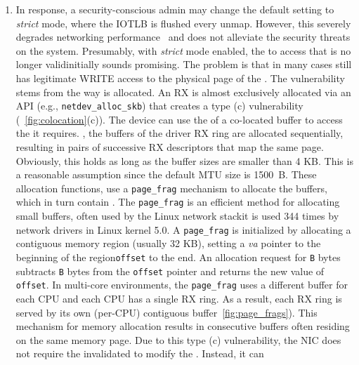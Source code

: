 \begin{enumerate}[label=(\roman*),wide, labelwidth=!, labelindent=0pt]
\item In response, a security-conscious admin may change the default setting to \emph{strict} mode, where the IOTLB is flushed \DIFdelbegin {}\DIFdelend \DIFaddbegin {}\DIFaddend every unmap. However, this \DIFdelbegin {}\DIFdelend severely degrades networking performance~\cite{MMT16,MSMT18} \DIFdelbegin \DIFdel{, }\DIFdelend and does not alleviate the security threats on the system. Presumably, with \emph{strict} mode enabled, the \iova{} \DIFdelbegin {}\DIFdelend \DIFaddbegin {}\DIFaddend to access that \shinfo{} is no longer valid\DIFdelbegin {}\DIFdelend \DIFaddbegin {}\DIFaddend initially sounds promising. The problem is that \DIFdelbegin {}\DIFdelend in many cases \DIFdelbegin \DIFdel{, }\DIFdelend \DIFaddbegin {}\DIFaddend still has legitimate WRITE access to the physical page of the \shinfo. The vulnerability stems from the way \data{} is allocated. An RX \skb{} is almost exclusively allocated via an API (e.g., \texttt{netdev\_alloc\_skb}) that creates a type (c) \subpage{} vulnerability (\DIFdelbegin {}\DIFdelend \DIFaddbegin {}\DIFaddend ~\ref{fig:colocation}(c)). The device can use the \iova{} of a co-located buffer to access the \shinfo{} it requires. \DIFdelbegin {}\DIFdelend \DIFaddbegin {}\DIFaddend , the buffers of the driver RX ring are allocated sequentially, resulting in pairs of successive RX descriptors that map the same page. Obviously, this holds as long as the buffer sizes are smaller than 4 KB. This is a reasonable assumption since the default MTU size is 1500~B. These allocation functions, use a \texttt{page\_frag} mechanism to allocate the \data{} buffers, which in turn contain \shinfo. The \texttt{page\_frag} is an efficient method for allocating small buffers, \DIFaddbegin {}\DIFaddend often used by the Linux network stack\DIFdelbegin \DIFdel{(}\DIFdelend \DIFaddbegin {}\DIFaddend it is used 344 times by network drivers in Linux kernel 5.0\DIFdelbegin \DIFdel{)}\DIFdelend . A \texttt{page\_frag} is initialized by allocating a contiguous memory region (usually 32 KB), setting a \textit{va} pointer to the beginning of the region\DIFdelbegin {}\DIFdelend \DIFaddbegin {}\DIFaddend \texttt{offset} to the end. An allocation request for \texttt{B} bytes subtracts \texttt{B} bytes from the \texttt{offset} pointer and returns the new value of \DIFaddbegin {}\DIFaddend \texttt{offset}. In multi-core environments, the \texttt{page\_frag} uses a different buffer for each CPU and each CPU has a single RX ring. As a result, each RX ring is served by its own (per-CPU) contiguous buffer\DIFdelbegin {}\DIFdelend \DIFaddbegin {}\DIFaddend ~\ref{fig:page_frags}). This mechanism for memory allocation results in consecutive \data{} buffers often residing on the same memory page. Due to this type (c) \subpage{} vulnerability, the NIC does not require the invalidated \iova{} to modify the \shinfo. Instead, it can 
\end{enumerate}
